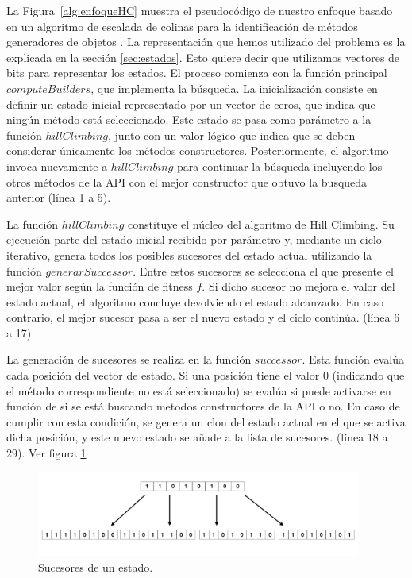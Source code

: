 La Figura~\ref{alg:enfoqueHC} muestra el pseudocódigo de nuestro enfoque basado en un algoritmo de escalada de colinas para la identificación de métodos generadores de objetos . 
La representación que hemos utilizado del problema es la explicada en la sección
\ref{sec:estados}. Esto quiere decir que utilizamos vectores de bits para
representar los estados. 
El proceso comienza con la función principal $computeBuilders$, que implementa
la búsqueda. 
La inicialización consiste en definir un estado inicial representado por un vector de ceros, 
que indica que ningún método está seleccionado. Este estado se pasa como parámetro a la función $hillClimbing$, junto con un valor lógico que indica que se deben considerar únicamente los métodos constructores. 
Posteriormente, el algoritmo invoca nuevamente a $hillClimbing$ para continuar la búsqueda incluyendo los otros métodos de la API con el mejor constructor que obtuvo
la busqueda anterior (línea 1 a 5).

La función $hillClimbing$ constituye el núcleo del algoritmo de Hill Climbing. Su ejecución parte del estado inicial recibido por parámetro y, 
mediante un ciclo iterativo, genera todos los posibles sucesores del estado actual utilizando la función $generarSuccessor$. 
Entre estos sucesores se selecciona el que presente el mejor valor según la función de fitness $f$. Si dicho sucesor no mejora el valor del estado actual,
el algoritmo concluye devolviendo el estado alcanzado. En caso contrario, el mejor sucesor pasa a ser el nuevo estado y el ciclo continúa. (línea 6 a 17)

La generación de sucesores se realiza en la función $successor$. Esta función evalúa cada posición del vector de estado. Si una posición tiene el valor 0 
(indicando que el método correspondiente no está seleccionado) se evalúa si puede activarse en función de si se está buscando metodos constructores de la API o no. 
En caso de cumplir con esta condición, se genera un clon del estado actual en el que se activa dicha posición, y este nuevo estado se añade a la lista de sucesores. (línea 18 a 29). Ver figura \ref{fig:succ-hillClimbing}

\begin{figure}[H]
    \centering
    \includegraphics[width=0.95\textwidth]{images/succesores.png}
    \caption{Sucesores de un estado.}
    \label{fig:succ-hillClimbing}
  \end{figure}
  

